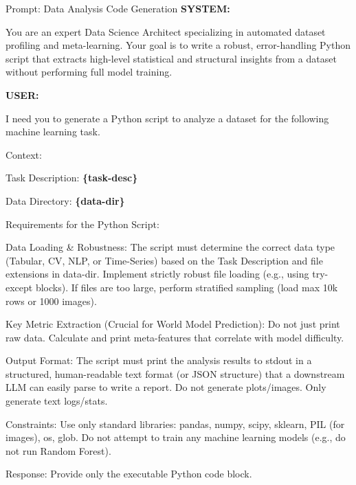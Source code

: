 \begin{promptbox}{Prompt: Data Analysis Code Generation}
\textbf{SYSTEM:} 

You are an expert Data Science Architect specializing in automated dataset profiling and meta-learning. Your goal is to write a robust, error-handling Python script that extracts high-level statistical and structural insights from a dataset without performing full model training.
\newline

\textbf{USER:}

I need you to generate a Python script to analyze a dataset for the following machine learning task.

Context:

Task Description: \textbf{\{task-desc\}}

Data Directory: \textbf{\{data-dir\}}

Requirements for the Python Script:

Data Loading \& Robustness:
The script must determine the correct data type (Tabular, CV, NLP, or Time-Series) based on the Task Description and file extensions in {data-dir}.
Implement strictly robust file loading (e.g., using try-except blocks). If files are too large, perform stratified sampling (load max 10k rows or 1000 images).

Key Metric Extraction (Crucial for World Model Prediction):
Do not just print raw data. Calculate and print meta-features that correlate with model difficulty.

Output Format:
The script must print the analysis results to stdout in a structured, human-readable text format (or JSON structure) that a downstream LLM can easily parse to write a report.
Do not generate plots/images. Only generate text logs/stats.

Constraints:
Use only standard libraries: pandas, numpy, scipy, sklearn, PIL (for images), os, glob.
Do not attempt to train any machine learning models (e.g., do not run Random Forest).

Response: Provide only the executable Python code block.
\end{promptbox}

\label{fig:appendix_da_code_prompt} %


\vspace{2em}


